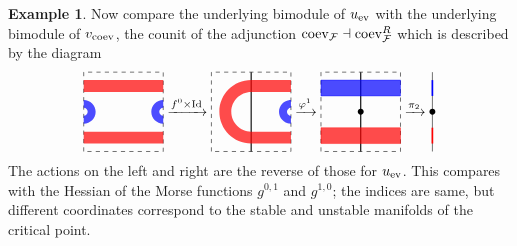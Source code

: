 \documentclass[10pt, reqno, twoside
, final
]{amsart}
\numberwithin{equation}{subsection}%
\theoremstyle{definition}
\theoremstyle{definition}
\theoremstyle{definition}
\theoremstyle{definition}
\theoremstyle{definition}
\theoremstyle{definition}
\theoremstyle{definition}
\theoremstyle{definition}
\theoremstyle{definition}
\theoremstyle{plain}
\theoremstyle{definition}
\theoremstyle{plain}
\theoremstyle{definition}
\theoremstyle{plain}
\theoremstyle{definition}
\theoremstyle{definition}
\theoremstyle{plain}
\theoremstyle{plain}
\theoremstyle{definition}
\newtheorem{ex}[defn]{Example}
\theoremstyle{plain}
\theoremstyle{plain}
\theoremstyle{plain}
\begin{document}
\begin{ex}
Now compare the underlying bimodule of $u_{\mathrm{ev}}$ with the underlying bimodule of $v_{\mathrm{coev}}$, the counit of the adjunction $\mathrm{coev}_{\mathcal{F}} \dashv \mathrm{coev}_{\mathcal{F}}^R$  which is described by the diagram
\begin{equation*}
  \begin{tikzpicture}[baseline=0.9cm]
    \draw[dashed] (0,0) rectangle (2,2);
     \fill[red,opacity=0.7] (0,0.2) rectangle (2,0.5);
    \fill[red,opacity=0.7] (0,1.5) rectangle (2,1.8);
     \fill[blue,opacity=0.7] (0,0.7) arc[start angle = -90, end angle = 90,radius = 0.3]  
    -- (0,1.1)  arc[start angle = 90, end angle = -90,radius = 0.1]  -- (0,0.7) ;
     \fill[blue,opacity=0.7] (2,0.7) arc[start angle = 270, end angle = 90,radius = 0.3]  
    -- (2,1.1)  arc[start angle = 90, end angle = 270,radius = 0.1]  -- (2,0.7) ;
\end{tikzpicture}
\xrightarrow{f^0 \times \Id}
\begin{tikzpicture}[baseline=0.9cm]
    \draw[dashed] (0,0) rectangle (2,2);
    \draw[thick] (1,2) -- (1,0);
    \fill[red,opacity=0.7] (2,0.2) -- (1,0.2) arc[start angle = 270, end angle = 90,radius = 0.8]  
    -- (2,1.8) -- (2,1.5) -- (1,1.5) arc[start angle = 90, end angle = 270,radius = 0.5] 
    -- (2,0.5) -- (2,0.2);
    \fill[blue,opacity=0.7] (2,0.7) arc[start angle = 270, end angle = 90,radius = 0.3]  
    -- (2,1.1)  arc[start angle = 90, end angle = 270,radius = 0.1]  -- (2,0.7) ;
\end{tikzpicture}
\xrightarrow{\varphi^{1}}
\begin{tikzpicture}[baseline=0.9cm]
    \draw[dashed] (0,0) rectangle (2,2);
    \draw[thick] (1,2) -- (1,0);
    \node[fill,circle,inner sep=1.5pt] at (1,1) {};
    \filldraw[red,opacity=0.7] (0,0.2) rectangle (2,0.6);
    \filldraw[blue,opacity=0.7] (0,1.4) rectangle (2,1.8);
\end{tikzpicture}
\xrightarrow{\pi_2}
\begin{tikzpicture}[baseline=0.9cm]
    \draw (1,2) -- (1,0);
    \node[fill,circle,inner sep=1.5pt] at (1,1) {};
    \draw[red,very thick] (1,0.2) -- (1,0.6);
    \draw[blue,very thick] (1,1.4) -- (1,1.8);
\end{tikzpicture}
\end{equation*}
The actions on the left and right are the reverse of those for $u_{\mathrm{ev}}$. This compares with the Hessian of the Morse functions  $g^{0,1}$ and $g^{1,0}$; the indices are same, but different coordinates correspond to the stable and unstable manifolds of the critical point.
\end{ex}
\end{document}
